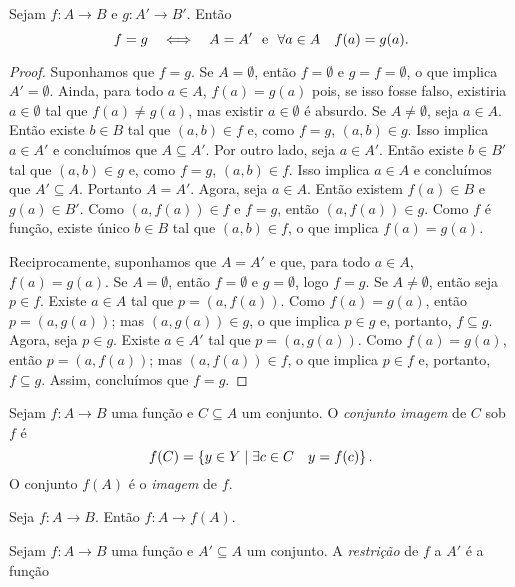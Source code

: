 \begin{prop}\label{conj:prop.func.ig}
Sejam $f: A \to B$ e $g:A' \to B'$. Então
	\begin{equation*}
	f=g \quad \Longleftrightarrow \quad A=A' \text{\ \ e\ \ } \forall a \in A \quad f(a)=g(a).
	\end{equation*}
\end{prop}
\begin{proof}
Suponhamos que $f=g$. Se $A=\emptyset$, então $f=\emptyset$ e $g=f=\emptyset$, o que implica $A'=\emptyset$. Ainda, para todo $a \in A$, $f(a)=g(a)$ pois, se isso fosse falso, existiria $a \in \emptyset$ tal que $f(a)\neq g(a)$, mas existir $a \in \emptyset$ é absurdo. Se $A \neq \emptyset$, seja $a \in A$. Então existe $b \in B$ tal que $(a,b) \in f$ e, como $f=g$, $(a,b) \in g$. Isso implica $a \in A'$ e concluímos que $A \subseteq A'$. Por outro lado, seja $a \in A'$. Então existe $b \in B'$ tal que $(a,b) \in g$ e, como $f=g$, $(a,b) \in f$. Isso implica $a \in A$ e concluímos que $A' \subseteq A$. Portanto $A=A'$. Agora, seja $a \in A$. Então existem $f(a) \in B$ e $g(a) \in B'$. Como $(a,f(a)) \in f$ e $f=g$, então $(a,f(a)) \in g$. Como $f$ é função, existe único $b \in B$ tal que $(a,b) \in f$, o que implica $f(a)=g(a)$.
	
Reciprocamente, suponhamos que $A=A'$ e que, para todo $a \in A$, $f(a)=g(a)$. Se $A=\emptyset$, então $f=\emptyset$ e $g=\emptyset$, logo $f=g$. Se $A \neq \emptyset$, então seja $p \in f$. Existe $a \in A$ tal que $p=(a,f(a))$. Como $f(a)=g(a)$, então $p=(a,g(a))$; mas $(a,g(a)) \in g$, o que implica $p \in g$ e, portanto, $f \subseteq g$. Agora, seja $p \in g$. Existe $a \in A'$ tal que $p=(a,g(a))$. Como $f(a)=g(a)$, então $p=(a,f(a))$; mas $(a,f(a)) \in f$, o que implica $p \in f$ e, portanto, $f \subseteq g$. Assim, concluímos que $f=g$.
\end{proof}

\begin{defi}
Sejam $f: A \to B$ uma função e $C \subseteq A$ um conjunto. O \emph{conjunto imagem} de $C$ sob $f$ é
	\begin{equation*}
	f(C)=\left\{y \in Y \;\middle\vert\; \exists c \in C \quad y=f(c) \right\}.
	\end{equation*}
O conjunto $f(A)$ é o \emph{imagem} de $f$.
\end{defi}

\begin{prop}
Seja $f: A \to B$. Então $f: A \to f(A)$.
\end{prop}

\begin{defi}
Sejam $f: A \to B$ uma função e $A' \subseteq A$ um conjunto. A \emph{restrição} de $f$ a $A'$ é a função 
\end{defi}

